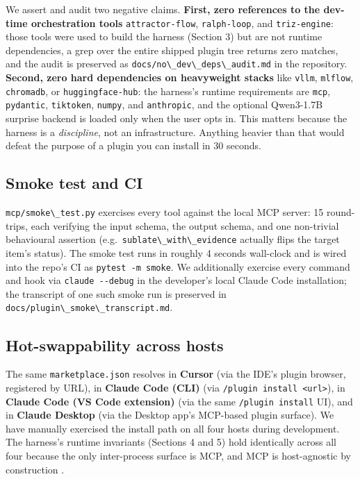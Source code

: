 We assert and audit two negative claims. \textbf{First, zero references to the dev-time orchestration tools} \passthrough{\lstinline!attractor-flow!}, \passthrough{\lstinline!ralph-loop!}, and \passthrough{\lstinline!triz-engine!}: those tools were used to build the harness (Section 3) but are not runtime dependencies, a grep over the entire shipped plugin tree returns zero matches, and the audit is preserved as \passthrough{\lstinline!docs/no\_dev\_deps\_audit.md!} in the repository. \textbf{Second, zero hard dependencies on heavyweight stacks} like \passthrough{\lstinline!vllm!}, \passthrough{\lstinline!mlflow!}, \passthrough{\lstinline!chromadb!}, or \passthrough{\lstinline!huggingface-hub!}: the harness's runtime requirements are \passthrough{\lstinline!mcp!}, \passthrough{\lstinline!pydantic!}, \passthrough{\lstinline!tiktoken!}, \passthrough{\lstinline!numpy!}, and \passthrough{\lstinline!anthropic!}, and the optional Qwen3-1.7B surprise backend is loaded only when the user opts in. This matters because the harness is a \emph{discipline}, not an infrastructure. Anything heavier than that would defeat the purpose of a plugin you can install in 30 seconds.

\subsection{Smoke test and CI}\label{smoke-test-and-ci}

\passthrough{\lstinline!mcp/smoke\_test.py!} exercises every tool against the local MCP server: 15 round-trips, each verifying the input schema, the output schema, and one non-trivial behavioural assertion (e.g.~\passthrough{\lstinline!sublate\_with\_evidence!} actually flips the target item's status). The smoke test runs in roughly 4 seconds wall-clock and is wired into the repo's CI as \passthrough{\lstinline!pytest -m smoke!}. We additionally exercise every command and hook via \passthrough{\lstinline!claude --debug!} in the developer's local Claude Code installation; the transcript of one such smoke run is preserved in \passthrough{\lstinline!docs/plugin\_smoke\_transcript.md!}.

\subsection{Hot-swappability across hosts}\label{hot-swappability-across-hosts}

The same \passthrough{\lstinline!marketplace.json!} resolves in \textbf{Cursor} (via the IDE's plugin browser, registered by URL), in \textbf{Claude Code (CLI)} (via \passthrough{\lstinline!/plugin install <url>!}), in \textbf{Claude Code (VS Code extension)} (via the same \passthrough{\lstinline!/plugin install!} UI), and in \textbf{Claude Desktop} (via the Desktop app's MCP-based plugin surface). We have manually exercised the install path on all four hosts during development. The harness's runtime invariants (Sections 4 and 5) hold identically across all four because the only inter-process surface is MCP, and MCP is host-agnostic by construction \citep{anthropic2025mcp}.

